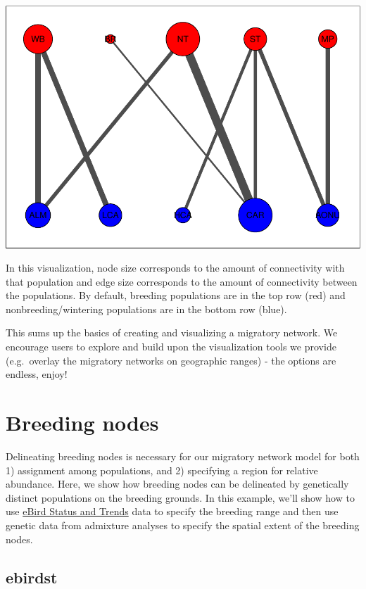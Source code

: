 \documentclass[
]{book}
\begin{document}
\includegraphics{Mignette_files/figure-latex/unnamed-chunk-5-1.pdf}

In this visualization, node size corresponds to the amount of connectivity with that population and edge size corresponds to the amount of connectivity between the populations. By default, breeding populations are in the top row (red) and nonbreeding/wintering populations are in the bottom row (blue).

This sums up the basics of creating and visualizing a migratory network. We encourage users to explore and build upon the visualization tools we provide (e.g.~overlay the migratory networks on geographic ranges) - the options are endless, enjoy!

\hypertarget{breeding}{%
\chapter{Breeding nodes}\label{breeding}}

Delineating breeding nodes is necessary for our migratory network model for both 1) assignment among populations, and 2) specifying a region for relative abundance. Here, we show how breeding nodes can be delineated by genetically distinct populations on the breeding grounds. In this example, we'll show how to use \href{https://ebird.org/science/status-and-trends}{eBird Status and Trends} data to specify the breeding range and then use genetic data from admixture analyses to specify the spatial extent of the breeding nodes.

\hypertarget{ebirdst}{%
\section{ebirdst}\label{ebirdst}}
\end{document}
